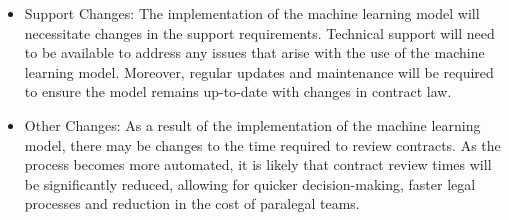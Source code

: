 \begin{itemize}
    \item Support Changes: The implementation of the machine learning model will necessitate changes in the support requirements. Technical support will need to be available to address any issues that arise with the use of the machine learning model. Moreover, regular updates and maintenance will be required to ensure the model remains up-to-date with changes in contract law.
    \item Other Changes: As a result of the implementation of the machine learning model, there may be changes to the time required to review contracts. As the process becomes more automated, it is likely that contract review times will be significantly reduced, allowing for quicker decision-making, faster legal processes and reduction in the cost of paralegal teams. 














\end{itemize}


